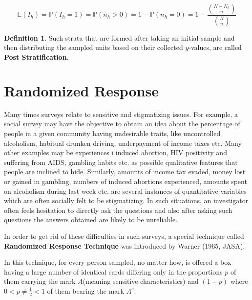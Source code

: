 \documentclass[12pt]{article}
\newcommand{\prob}{\mathbb{P}}
\newcommand{\E}{\mathbb{E}}
\theoremstyle{definition}
\newtheorem{defn}{Definition}
\newenvironment{definition}{
\begin{tcolorbox}[colback=green!5!white,colframe=green!75!black, parbox = false]\begin{defn} }{\end{defn}\end{tcolorbox} }
\begin{document}
$$\E(I_h) = \prob(I_h = 1) = \prob(n_h > 0) = 1 - \prob(n_h = 0) = 1 - \dfrac{\binom{N - N_h}{n}}{\binom{N}{n}}$$

\begin{definition}
    Such strata that are formed after taking an initial sample and then distributing the sampled units based on their collected $y$-values, are called \textbf{Post Stratification}.
\end{definition}


\section{Randomized Response}

Many times surveys relate to sensitive and stigmatizing issues. For example, a social survey may have the objective to obtain an idea about the percentage of people in a given community having undesirable traits, like uncontrolled alcoholism, habitual drunken driving, underpayment of income taxes etc. Many other examples may be experiences i  induced abortion, HIV positivity and suffering from AIDS, gambling habits etc. as possible qualitative features that people are inclined to hide. Similarly, amounts of income tax evaded, money lost or gained in gambling, numbers of induced abortions experienced, amounts spent on alcoholism during last week etc. are several instances of quantitative variables which are often socially felt to be stigmatizing. In such situations, an investigator often feels hesitation to directly ask the questions and also after asking such questions the answers obtained are likely to be unreliable.

In order to get rid of these difficulties in such surveys, a special technique called \textbf{Randomized Response Technique} was introduced by Warner (1965, JASA). 

In this technique, for every person sampled, no matter how, is offered a box having a large number of identical cards differing only in the proportions $p$ of them carrying the mark $A$(meaning sensitive characteristics) and $(1-p)$ where $0< p \neq \frac{1}{2} < 1$ of them bearing the mark $A^c$. 
\end{document}
